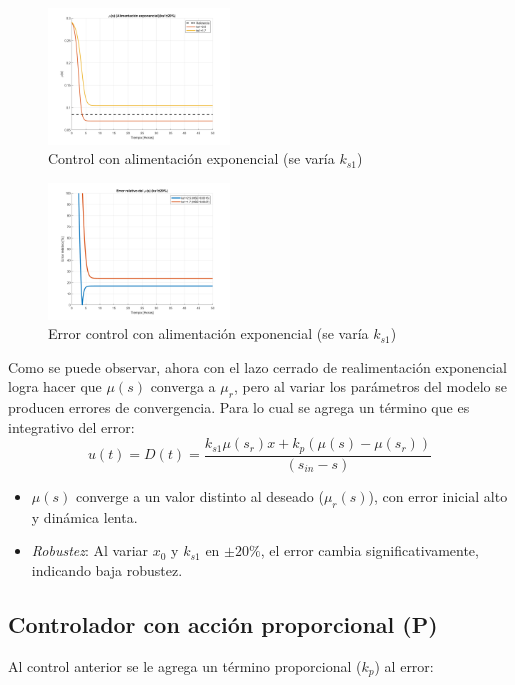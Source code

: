 \documentclass[letterpaper, 10 pt, conference]{ieeeconf}  %
\begin{document}
\begin{figure}[H]
  \centering
  \includegraphics[width=0.43\textwidth]{./Images_tp3/exp_ks1.png}
  \caption{Control con alimentación exponencial (se varía $k_{s1}$)}
\end{figure}
\begin{figure}[H]
  \centering
  \includegraphics[width=0.43\textwidth]{./Images_tp3/exp_err_ks1.png}
  \caption{Error control con alimentación exponencial (se varía $k_{s1}$)}
\end{figure}

Como se puede observar, ahora con el lazo cerrado de realimentación exponencial logra hacer que $\mu(s)$ converga a $\mu_r$, pero al variar los parámetros del modelo se producen errores de convergencia. Para lo cual se agrega un término que es integrativo del error:
\begin{equation*}
  u(t) = D(t) = \frac{k_{s1}\mu(s_r)x+k_p(\mu(s)-\mu(s_r))}{(s_{in}-s)}
\end{equation*}

\begin{itemize}  
    \item \(\mu(s)\) converge a un valor distinto al deseado (\(\mu_r(s)\)), con error inicial alto y dinámica lenta.  
    \item \textit{Robustez}: Al variar \(x_0\) y \(k_{s1}\) en \(\pm 20\%\), el error cambia significativamente, indicando baja robustez.  
\end{itemize}  

\subsection{Controlador con acción proporcional (P)}  
Al control anterior se le agrega un término proporcional (\(k_p\)) al error:
\end{document}

